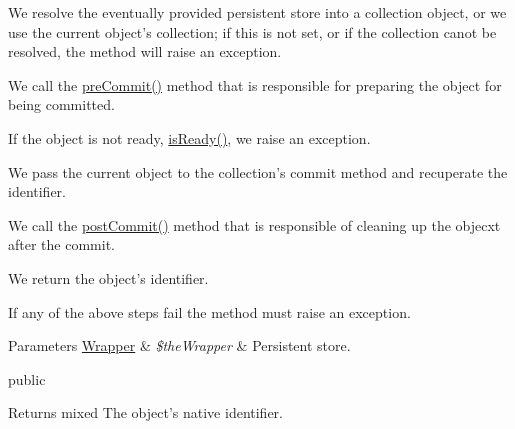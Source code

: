 \begin{DoxyItemize}
\item We resolve the eventually provided persistent store into a collection object, or we use the current object's collection; if this is not set, or if the collection canot be resolved, the method will raise an exception. 
\item We call the {\ttfamily \hyperlink{class_ontology_wrapper_1_1_persistent_object_ae621d7c6ec2b645d65ae86e6c183c7ef}{pre\-Commit()}} method that is responsible for preparing the object for being committed. 
\item If the object is not ready, \hyperlink{class_ontology_wrapper_1_1_persistent_object_abd1574b220543be97cb221fa2caded7a}{is\-Ready()}, we raise an exception. 
\item We pass the current object to the collection's commit method and recuperate the identifier. 
\item We call the {\ttfamily \hyperlink{class_ontology_wrapper_1_1_persistent_object_a52d445c7c34fd2b28c48c4c47d02b1db}{post\-Commit()}} method that is responsible of cleaning up the objecxt after the commit. 
\item We return the object's identifier. 
\end{DoxyItemize}

If any of the above steps fail the method must raise an exception.


\begin{DoxyParams}[1]{Parameters}
\hyperlink{class_ontology_wrapper_1_1_wrapper}{Wrapper} & {\em \$the\-Wrapper} & Persistent store.\\
\hline
\end{DoxyParams}
public \begin{DoxyReturn}{Returns}
mixed The object's native identifier.
\end{DoxyReturn}

